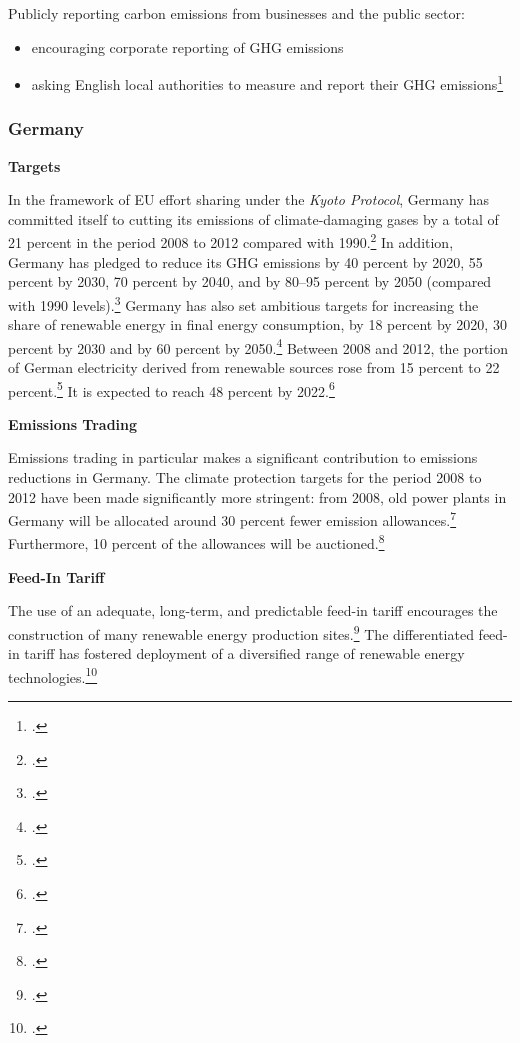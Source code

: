 \documentclass[10pt]{article}
\begin{document}
Publicly reporting carbon emissions from businesses and the public sector:
\begin{itemize}
	\item encouraging corporate reporting of GHG emissions
	\item asking English local authorities to measure and report their GHG emissions\footcite[][]{UKgovnt}
\end{itemize}



	\subsubsection{Germany}
	
	

\textbf{Targets}



In the framework of EU effort sharing under the \emph{Kyoto Protocol}, Germany has committed itself to cutting its emissions of climate-damaging gases by a total of 21 percent in the period 2008 to 2012 compared with 1990.\footcite[][]{KyotoTargetsGermany}
In addition, Germany has pledged to reduce its GHG emissions by 40 percent by 2020, 55 percent by 2030, 70 percent by 2040, and by 80--95 percent by 2050 (compared with 1990 levels).\footcite[][]{GermanyGHG}
Germany has also set ambitious targets for increasing the share of renewable energy in final energy consumption, by 18 percent by 2020, 30 percent by 2030 and by 60 percent by 2050.\footcite[][]{GermanyGHG}
Between 2008 and 2012, the portion of German electricity derived from renewable sources rose from 15 percent to 22 percent.\footcite[][p. 12]{EconWindmills}
It is expected to reach 48 percent by 2022.\footcite[][]{EconWindmills}



\textbf{Emissions Trading}



Emissions trading in particular makes a significant contribution to emissions reductions in Germany. 
The climate protection targets for the period 2008 to 2012 have been made significantly more stringent: from 2008, old power plants in Germany will be allocated around 30 percent fewer emission allowances.\footcite[][]{BMUprogramme}
Furthermore, 10 percent of the allowances will be auctioned.\footcite[][]{GermanyTrading}



\textbf{Feed-In Tariff}



The use of an adequate, long-term, and predictable feed-in tariff encourages the construction of many renewable energy production sites.\footcite[][]{GermanyTariff}
The differentiated feed-in tariff has fostered deployment of a  diversified range of renewable energy technologies.\footcite[][]{GermanyTariff}
\end{document}
